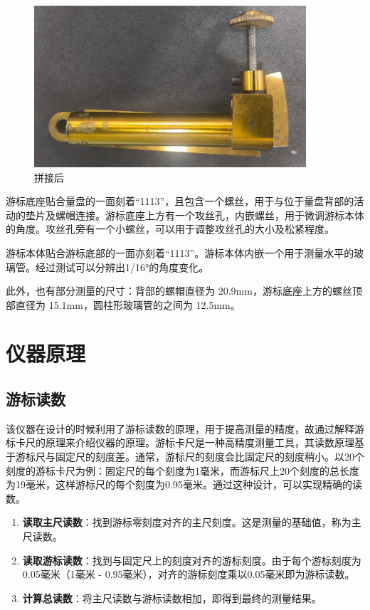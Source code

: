 \documentclass[UTF8]{ctexart}
\begin{document}
\begin{figure}[h]
\begin{minipage}[t]{0.3\textwidth}
    \end{minipage}
    \begin{minipage}[t]{0.3\textwidth}
        \centering
        \includegraphics[width=0.9\textwidth]{img/vernier_structure_assembled.jpg}
        \caption{拼接后}
        \label{fig:vernier_structure_assembled}
    \end{minipage}
\end{figure}

游标底座贴合量盘的一面刻着“1113”，且包含一个螺丝，用于与位于量盘背部的活动的垫片及螺帽连接。游标底座上方有一个攻丝孔，内嵌螺丝，用于微调游标本体的角度。攻丝孔旁有一个小螺丝，可以用于调整攻丝孔的大小及松紧程度。

游标本体贴合游标底部的一面亦刻着“1113”。游标本体内嵌一个用于测量水平的玻璃管。经过测试可以分辨出1/16°的角度变化。

此外，也有部分测量的尺寸：背部的螺帽直径为 20.9mm，游标底座上方的螺丝顶部直径为 15.1mm，圆柱形玻璃管的之间为 12.5mm。

\section{仪器原理}

\subsection{游标读数}

该仪器在设计的时候利用了游标读数的原理，用于提高测量的精度，故通过解释游标卡尺的原理来介绍仪器的原理。游标卡尺是一种高精度测量工具，其读数原理基于游标尺与固定尺的刻度差。通常，游标尺的刻度会比固定尺的刻度稍小。以20个刻度的游标卡尺为例：固定尺的每个刻度为1毫米，而游标尺上20个刻度的总长度为19毫米，这样游标尺的每个刻度为0.95毫米。通过这种设计，可以实现精确的读数。

\begin{enumerate}
    \item \textbf{读取主尺读数}：找到游标零刻度对齐的主尺刻度。这是测量的基础值，称为主尺读数。
    \item \textbf{读取游标读数}：找到与固定尺上的刻度对齐的游标刻度。由于每个游标刻度为0.05毫米（1毫米 - 0.95毫米），对齐的游标刻度乘以0.05毫米即为游标读数。
    \item \textbf{计算总读数}：将主尺读数与游标读数相加，即得到最终的测量结果。
\end{enumerate}
\end{document}
